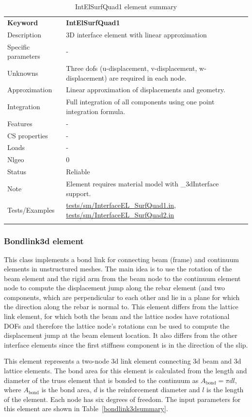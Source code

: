 \documentclass[a4paper]{article}
\newcommand{\param}[1]{\texttt{#1}} %
\newcommand{\templabel}{}%
\newcommand{\tempcaption}{}%
\newcounter{nelpar}
\newenvironment{elementsummary}[5]{%
  \gdef\tempcaption{#4}%
  \gdef\templabel{#5}%
  \setcounter{nelpar}{0}%
  \begin{center} %
    \begin{table}[!htb] %
      \begin{tabular}{|l|p{9cm}|}\hline %
        {\bf Keyword} & \bf{#1}\\ %
        {Description} & {#2}\\ %
        {Specific parameters} & {#3}\\ \hline %
}{
  \\ \hline %
      \end{tabular}%
      \caption{\tempcaption}%
      \label{\templabel}%
    \end{table}%
  \end{center}%
}
\newcommand{\elementParam}[1]{%
  \ifthenelse{\value{nelpar}>0} %
             {&{#1}}%
             {\setcounter{nelpar}{1}Parameters&{#1}}%
             \\%
}
\newcommand{\elementDescription}[2]{{#1} & {#2}\\}
\begin{document}
\begin{elementsummary}{IntElSurfQuad1}{3D  interface element with linear approximation}{-}{IntElSurfQuad1 element summary}{Interface3dquadlinsummary}
\elementDescription{Unknowns}{Three dofs (u-displacement, v-displacement, w-displacement) are required in each node.}
\elementDescription{Approximation}{Linear approximation of displacements and geometry.}
\elementDescription{Integration}{Full integration of all components using one point integration formula.}
\elementDescription{Features}{-}
\elementDescription{CS properties}{-}
\elementDescription{Loads}{-}
\elementDescription{Nlgeo}{0}
\elementDescription{Status}{Reliable}
\elementDescription{Note}{Element requires material model with \_3dInterface support.}
\elementDescription{Tests/Examples}{\href{https://github.com/oofem/oofem/blob/devel/tests/sm/InterfaceEL\_SurfQuad1.in}{tests/sm/InterfaceEL\_SurfQuad1.in},
  \href{https://github.com/oofem/oofem/blob/devel/tests/sm/InterfaceEL\_SurfQuad2.in}{tests/sm/InterfaceEL\_SurfQuad2.in}
}
\end{elementsummary}


\clearpage
\subsubsection{Bondlink3d element}
This class implements a bond link for connecting beam (frame) and continuum elements in unstructured meshes.
The main idea is to use the rotation of the beam element and the rigid arm from the beam node to the continuum element node to compute the displacement jump along the rebar element (and two components, which are perpendicular to each other and lie in a plane for which the direction along the rebar is normal to. This element differs from the lattice link element, for which both the beam and the lattice nodes have rotational DOFs and therefore the lattice node's rotations can be used to compute the displacement jump at the beam element location. It also differs from the other interface elements since the first stiffness component is in the direction of the slip.     

This element represents a two-node 3d link element connecting 3d beam and 3d lattice elements.
The bond area for this element is calculated from the length and diameter of the truss element that is bonded to the continuum as $A_{\mathrm{bond}} = \pi d l$, where $A_{\mathrm{bond}}$ is the bond area, $d$ is the reinforcement diameter and $l$ is the length of the element. Each node has six degrees of freedom. 
The input parameters for this element are shown in Table~\ref{bondlink3dsummary}. 
\end{document}
